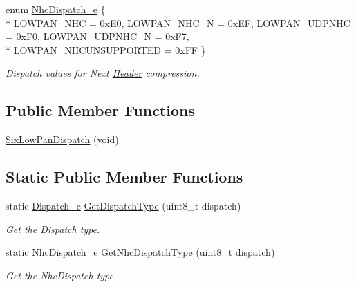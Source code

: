 \begin{DoxyCompactItemize}
\item 
enum \hyperlink{classns3_1_1SixLowPanDispatch_acbf93399dca3b5424dcc76de45a57f5f}{Nhc\+Dispatch\+\_\+e} \{ \\*
\hyperlink{classns3_1_1SixLowPanDispatch_acbf93399dca3b5424dcc76de45a57f5fa22b0e9f6421f1e0967bce31d15ff0fde}{L\+O\+W\+P\+A\+N\+\_\+\+N\+HC} = 0x\+E0, 
\hyperlink{classns3_1_1SixLowPanDispatch_acbf93399dca3b5424dcc76de45a57f5fa5a644d6fd21c02b5635f642035f07cb8}{L\+O\+W\+P\+A\+N\+\_\+\+N\+H\+C\+\_\+N} = 0x\+EF, 
\hyperlink{classns3_1_1SixLowPanDispatch_acbf93399dca3b5424dcc76de45a57f5faf1d4da6a831d704993ea3946327c8c0c}{L\+O\+W\+P\+A\+N\+\_\+\+U\+D\+P\+N\+HC} = 0x\+F0, 
\hyperlink{classns3_1_1SixLowPanDispatch_acbf93399dca3b5424dcc76de45a57f5fa65025143f10fb23a16e0b19199aa9aff}{L\+O\+W\+P\+A\+N\+\_\+\+U\+D\+P\+N\+H\+C\+\_\+N} = 0x\+F7, 
\\*
\hyperlink{classns3_1_1SixLowPanDispatch_acbf93399dca3b5424dcc76de45a57f5fa976faa6653ac641478d3c8861266d2e0}{L\+O\+W\+P\+A\+N\+\_\+\+N\+H\+C\+U\+N\+S\+U\+P\+P\+O\+R\+T\+ED} = 0x\+FF
 \}\begin{DoxyCompactList}\small\item\em Dispatch values for Next \hyperlink{classns3_1_1Header}{Header} compression. \end{DoxyCompactList}
\end{DoxyCompactItemize}
\subsection*{Public Member Functions}
\begin{DoxyCompactItemize}
\item 
\hyperlink{classns3_1_1SixLowPanDispatch_aff03e82e7c40b0312a9d4384f62ce6a8}{Six\+Low\+Pan\+Dispatch} (void)
\end{DoxyCompactItemize}
\subsection*{Static Public Member Functions}
\begin{DoxyCompactItemize}
\item 
static \hyperlink{classns3_1_1SixLowPanDispatch_aa51561db1ae4239db574d31d7aebbb5f}{Dispatch\+\_\+e} \hyperlink{classns3_1_1SixLowPanDispatch_a8405023ddddc8aee8825d743cae6ec21}{Get\+Dispatch\+Type} (uint8\+\_\+t dispatch)
\begin{DoxyCompactList}\small\item\em Get the Dispatch type. \end{DoxyCompactList}\item 
static \hyperlink{classns3_1_1SixLowPanDispatch_acbf93399dca3b5424dcc76de45a57f5f}{Nhc\+Dispatch\+\_\+e} \hyperlink{classns3_1_1SixLowPanDispatch_aadc1e9ded2e292f557da546a6a4e49d2}{Get\+Nhc\+Dispatch\+Type} (uint8\+\_\+t dispatch)
\begin{DoxyCompactList}\small\item\em Get the Nhc\+Dispatch type. \end{DoxyCompactList}\end{DoxyCompactItemize}


